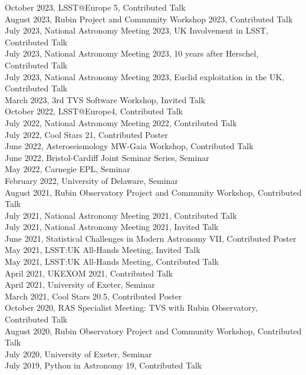 \documentclass[letter, margin, 10pt]{res} %
\begin{document}
\begin{resume}
October 2023, LSST@Europe 5, Contributed Talk\\
August 2023, Rubin Project and Community Workshop 2023, Contributed Talk\\
July 2023, National Astronomy Meeting 2023, UK Involvement in LSST, Contributed Talk\\
July 2023, National Astronomy Meeting 2023, 10 years after Herschel, Contributed Talk\\
July 2023, National Astronomy Meeting 2023, Euclid exploitation in the UK, Contributed Talk\\
March 2023, 3rd TVS Software Workshop, Invited Talk\\
October 2022, LSST@Europe4, Contributed Talk\\
July 2022, National Astronomy Meeting 2022, Contributed Talk\\
July 2022, Cool Stars 21, Contributed Poster\\
June 2022, Asteroseismology MW-Gaia Workshop, Contributed Talk\\
June 2022, Bristol-Cardiff Joint Seminar Series, Seminar\\
May 2022, Carnegie EPL, Seminar\\
February 2022, University of Delaware, Seminar\\
August 2021, Rubin Observatory Project and Community Workshop, Contributed Talk\\
July 2021, National Astronomy Meeting 2021, Contributed Talk\\
July 2021, National Astronomy Meeting 2021, Invited Talk\\
June 2021, Statistical Challenges in Modern Astronomy VII, Contributed Poster\\
May 2021, LSST:UK All-Hands Meeting, Invited Talk\\
May 2021, LSST:UK All-Hands Meeting, Contributed Talk\\
April 2021, UKEXOM 2021, Contributed Talk\\
April 2021, University of Exeter, Seminar\\
March 2021, Cool Stars 20.5, Contributed Poster\\
October 2020, RAS Specialist Meeting: TVS with Rubin Observatory, Contributed Talk\\
August 2020, Rubin Observatory Project and Community Workshop, Contributed Talk\\
July 2020, University of Exeter, Seminar\\
July 2019, Python in Astronomy 19, Contributed Talk\\

\end{resume}
\end{document}

